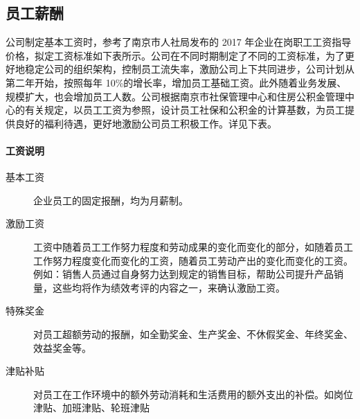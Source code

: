 \documentclass[violet]{main}
\begin{document}
			\subsection{员工薪酬}
				公司制定基本工资时，参考了南京市人社局发布的 2017 年企业在岗职工工资指导价格，拟定工资标准如下表所示。公司在不同时期制定了不同的工资标准，为了更好地稳定公司的组织架构，控制员工流失率，激励公司上下共同进步，公司计划从第二年开始，按照每年 10\%的增长率，增加员工基础工资。此外随着业务发展、规模扩大，也会增加员工人数。公司根据南京市社保管理中心和住房公积金管理中心的有关规定，以员工工资为参照，设计员工社保和公积金的计算基数，为员工提供良好的福利待遇，更好地激励公司员工积极工作。详见下表。
				\begin{center}
					\Tcbset{}
				\end{center}
		\paragraph{工资说明}
			\begin{description}
				\item[基本工资]企业员工的固定报酬，均为月薪制。
				\item[激励工资]工资中随着员工工作努力程度和劳动成果的变化而变化的部分，如随着员工工作努力程度变化而变化的工资，随着员工劳动产出的变化而变化的工资。例如：销售人员通过自身努力达到规定的销售目标，帮助公司提升产品销量，这些均将作为绩效考评的内容之一，来确认激励工资。
				\item[特殊奖金]对员工超额劳动的报酬，如全勤奖金、生产奖金、不休假奖金、年终奖金、效益奖金等。
				\item[津贴补贴]对员工在工作环境中的额外劳动消耗和生活费用的额外支出的补偿。如岗位津贴、加班津贴、轮班津贴
			\end{description}
\end{document}
